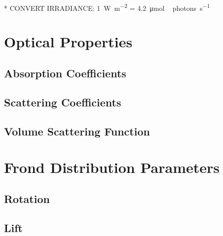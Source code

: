 * CONVERT IRRADIANCE: \SI{1}{\W\per\m^2} = \SI{4.2}{\micro\mole \,photons\per\second}

\section{Optical Properties}
\subsection{Absorption Coefficients}
\subsection{Scattering Coefficients}
\subsection{Volume Scattering Function}

\section{Frond Distribution Parameters}
\subsection{Rotation}
\subsection{Lift}
